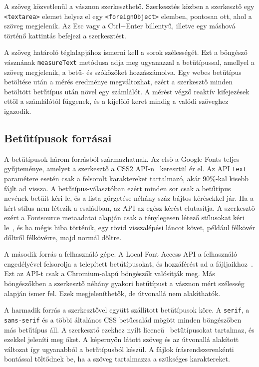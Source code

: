 A szöveg közvetlenül a vásznon szerkeszthető. Szerkesztés közben a szerkesztő egy \texttt{<textarea>} elemet helyez el egy \texttt{<foreignObject>} elemben, pontosan ott, ahol a szöveg megjelenik. Az Esc vagy a Ctrl+Enter billentyű, illetve egy máshová történő kattintás befejezi a szerkesztést.

A szöveg határoló téglalapjához ismerni kell a sorok szélességét. Ezt a böngésző vásznának \texttt{measureText} metódusa adja meg ugyanazzal a betűtípussal, amellyel a szöveg megjelenik, a betű- és szóközöket hozzászámolva. Egy webes betűtípus betöltése után a mérés eredménye megváltozhat, ezért a szerkesztő minden betöltött betűtípus után növel egy számlálót. A mérést végző reaktív kifejezések ettől a számlálótól függenek, és a kijelölő keret mindig a valódi szöveghez igazodik.

\subsection{Betűtípusok forrásai}

A betűtípusok három forrásból származhatnak. Az első a Google Fonts teljes gyűjteménye, amelyet a szerkesztő a CSS2 API-n~\cite{google-fonts-css2} keresztül ér el. Az API \texttt{text} paramétere esetén csak a felsorolt karaktereket tartalmazó, akár 90\%-kal kisebb fájlt ad vissza. A betűtípus-választóban ezért minden sor csak a betűtípus nevének betűit kéri le, és a lista görgetése néhány száz bájtos kérésekkel jár. Ha a kért stílus nem létezik a családban, az API az egész kérést elutasítja. A szerkesztő ezért a Fontsource metaadatai alapján csak a ténylegesen létező stílusokat kéri le~\cite{fontsource}, és ha mégis hiba történik, egy rövid visszalépési láncot követ, például félkövér dőltről félkövérre, majd normál dőltre.

A második forrás a felhasználó gépe. A Local Font Access API a felhasználó engedélyével felsorolja a telepített betűtípusokat, és hozzáférést ad a fájljaikhoz~\cite{mdn-local-fonts}. Ezt az API-t csak a Chromium-alapú böngészők valósítják meg. Más böngészőkben a szerkesztő néhány gyakori betűtípust a vásznon mért szélesség alapján ismer fel. Ezek megjeleníthetők, de útvonallá nem alakíthatók.

A harmadik forrás a szerkesztővel együtt szállított betűtípusok köre. A \texttt{serif}, a \texttt{sans-serif} és a többi általános CSS betűcsalád mögött minden böngészőben más betűtípus áll. A szerkesztő ezekhez nyílt licencű~\cite{ofl} betűtípusokat tartalmaz, és ezekkel jeleníti meg őket. A képernyőn látott szöveg és az útvonallá alakított változat így ugyanabból a betűtípusból készül. A fájlok írásrendszerenkénti bontással töltődnek be, ha a szöveg tartalmazza a szükséges karaktereket.

